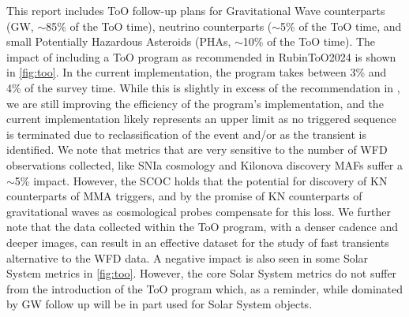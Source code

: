 This report includes ToO follow-up plans for Gravitational Wave counterparts (GW, \mbox{$\sim$85\%} of the ToO time), neutrino counterparts (\mbox{$\sim$5\%} of the ToO time, and small Potentially Hazardous Asteroids (PHAs, \mbox{$\sim$10\%} of the ToO time). The impact of including a ToO program as recommended in RubinToO2024 is shown in \autoref{fig:too}. In the current implementation, the program takes between 3\% and 4\% of the survey time. While this is slightly in excess of the recommendation in , we are still improving the efficiency of the program's implementation, and the current implementation likely represents an upper limit as no triggered sequence is terminated due to reclassification of the event and/or as the transient is identified.
We note that metrics that are very sensitive to the number of WFD observations collected, like SNIa cosmology and Kilonova discovery MAFs suffer a \mbox{$\sim$5\%} impact. However, the SCOC holds that the potential for discovery of KN counterparts of MMA triggers, and by the promise of KN counterparts of gravitational waves as cosmological probes \citep[\eg ,][]{PhysRevResearch.2.022006, gianfagna2024potential} compensate for this loss. We further note that the data collected within the ToO program, with a denser cadence and deeper images, can result in an effective dataset for the study of fast transients alternative to the WFD data. A negative impact is also seen in some Solar System metrics in \autoref{fig:too}. However, the core Solar System metrics do not suffer from the introduction of the ToO program which, as a reminder, while dominated by GW follow up will be in part used for Solar System  objects.

